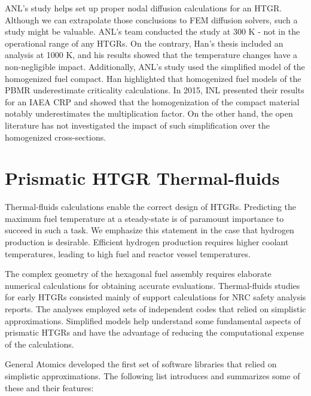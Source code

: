 ANL's study helps set up proper nodal diffusion calculations for an \gls{HTGR}.
Although we can extrapolate those conclusions to \gls{FEM} diffusion solvers, such a study might be valuable.
ANL's team conducted the study at 300 K - not in the operational range of any \glspl{HTGR}.
On the contrary, Han's thesis included an analysis at 1000 K, and his results showed that the temperature changes have a non-negligible impact.
Additionally, ANL's study used the simplified model of the homogenized fuel compact.
Han highlighted that homogenized fuel models of the \gls{PBMR} underestimate criticality calculations.
In 2015, \gls{INL} presented their results \cite{strydom_results_2015} for an \gls{IAEA} \gls{CRP} \cite{tyobeka_htgr_2011} and showed that the homogenization of the compact material notably underestimates the multiplication factor.
On the other hand, the open literature has not investigated the impact of such simplification over the homogenized cross-sections.

\section{Prismatic HTGR Thermal-fluids}
\label{sec:litrev-thermalf}

Thermal-fluids calculations enable the correct design of \glspl{HTGR}.
Predicting the maximum fuel temperature at a steady-state is of paramount importance to succeed in such a task.
We emphasize this statement in the case that hydrogen production is desirable.
Efficient hydrogen production requires higher coolant temperatures, leading to high fuel and reactor vessel temperatures.

The complex geometry of the hexagonal fuel assembly requires elaborate numerical calculations for obtaining accurate evaluations.
Thermal-fluids studies for early \glspl{HTGR} consisted mainly of support calculations for \gls{NRC} safety analysis reports.
The analyses employed sets of independent codes that relied on simplistic approximations.
Simplified models help understand some fundamental aspects of prismatic \glspl{HTGR} and have the advantage of reducing the computational expense of the calculations.

General Atomics \cite{shenoy_htgr_1974} developed the first set of software libraries that relied on simplistic approximations.
The following list introduces and summarizes some of these and their features:

